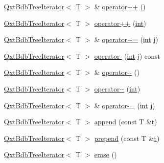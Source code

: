 \begin{DoxyCompactItemize}
\item 
\hyperlink{class_qxt_bdb_tree_iterator}{Qxt\-Bdb\-Tree\-Iterator}$<$ T $>$ \& \hyperlink{class_qxt_bdb_tree_iterator_a9da864f3b97ef278e2bfa717929fe81a}{operator++} ()
\item 
\hyperlink{class_qxt_bdb_tree_iterator}{Qxt\-Bdb\-Tree\-Iterator}$<$ T $>$ \hyperlink{class_qxt_bdb_tree_iterator_a53c7f0077d4badbf4462b0198184892d}{operator++} (\hyperlink{ioapi_8h_a787fa3cf048117ba7123753c1e74fcd6}{int})
\item 
\hyperlink{class_qxt_bdb_tree_iterator}{Qxt\-Bdb\-Tree\-Iterator}$<$ T $>$ \& \hyperlink{class_qxt_bdb_tree_iterator_a86c96db3b0f5676138149a2048e2a395}{operator+=} (\hyperlink{ioapi_8h_a787fa3cf048117ba7123753c1e74fcd6}{int} j)
\item 
\hyperlink{class_qxt_bdb_tree_iterator}{Qxt\-Bdb\-Tree\-Iterator}$<$ T $>$ \hyperlink{class_qxt_bdb_tree_iterator_ac122d0b7dfa3444cd96487a045e4e74c}{operator-\/} (\hyperlink{ioapi_8h_a787fa3cf048117ba7123753c1e74fcd6}{int} j) const 
\item 
\hyperlink{class_qxt_bdb_tree_iterator}{Qxt\-Bdb\-Tree\-Iterator}$<$ T $>$ \& \hyperlink{class_qxt_bdb_tree_iterator_aed32e703b3f981d7604f6590ced7be82}{operator-\/-\/} ()
\item 
\hyperlink{class_qxt_bdb_tree_iterator}{Qxt\-Bdb\-Tree\-Iterator}$<$ T $>$ \hyperlink{class_qxt_bdb_tree_iterator_ad9ebea96cd8b93f733600e2f07489338}{operator-\/-\/} (\hyperlink{ioapi_8h_a787fa3cf048117ba7123753c1e74fcd6}{int})
\item 
\hyperlink{class_qxt_bdb_tree_iterator}{Qxt\-Bdb\-Tree\-Iterator}$<$ T $>$ \& \hyperlink{class_qxt_bdb_tree_iterator_aa1a7b3a39d8687e7e36954b5fcd4972e}{operator-\/=} (\hyperlink{ioapi_8h_a787fa3cf048117ba7123753c1e74fcd6}{int} j)
\item 
\hyperlink{class_qxt_bdb_tree_iterator}{Qxt\-Bdb\-Tree\-Iterator}$<$ T $>$ \hyperlink{class_qxt_bdb_tree_iterator_a2c359c8470d9c25e9ebbda79d73e4f3d}{append} (const T \&\hyperlink{glext_8h_a00140d6f5c548b26daf170bf16e86a6d}{t})
\item 
\hyperlink{class_qxt_bdb_tree_iterator}{Qxt\-Bdb\-Tree\-Iterator}$<$ T $>$ \hyperlink{class_qxt_bdb_tree_iterator_a44478c3e66bace25274f8957beeecd6a}{prepend} (const T \&\hyperlink{glext_8h_a00140d6f5c548b26daf170bf16e86a6d}{t})
\item 
\hyperlink{class_qxt_bdb_tree_iterator}{Qxt\-Bdb\-Tree\-Iterator}$<$ T $>$ \hyperlink{class_qxt_bdb_tree_iterator_a3f9488535580700bdb242e64c68c3f25}{erase} ()
\end{DoxyCompactItemize}
